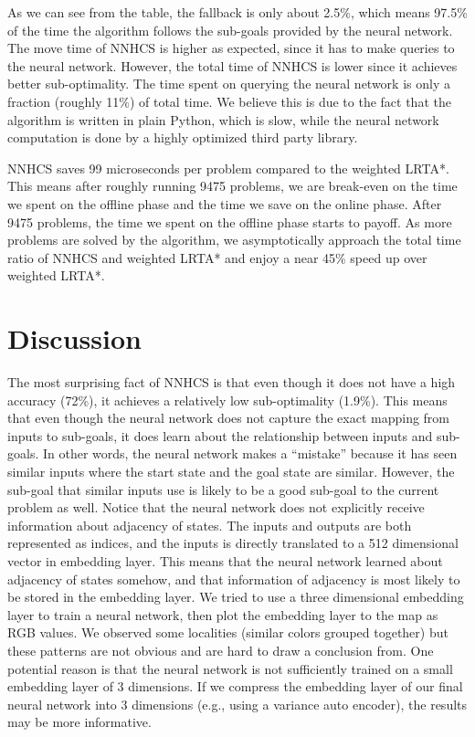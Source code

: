 \documentclass[letterpaper]{article}
\numberwithin{equation}{section}
\numberwithin{theorem}{section}
\numberwithin{lemma}{section}
\numberwithin{df}{section}
\begin{document}
    As we can see from the table, the fallback is only about 2.5\%, which means 97.5\% of the time the algorithm follows the sub-goals provided by the neural network.
    The move time of NNHCS is higher as expected, since it has to make queries to the neural network.
    However, the total time of NNHCS is lower since it achieves better sub-optimality.
    The time spent on querying the neural network is only a fraction (roughly 11\%) of total time.
    We believe this is due to the fact that the algorithm is written in plain Python, which is slow,
    while the neural network computation is done by a highly optimized third party library.

    NNHCS saves 99 microseconds per problem compared to the weighted LRTA*.
    This means after roughly running 9475 problems, we are break-even on the time we spent on the offline phase and the time we save on the online phase.
    After 9475 problems, the time we spent on the offline phase starts to payoff.
    As more problems are solved by the algorithm, we asymptotically approach the total time ratio of NNHCS and weighted LRTA* and enjoy a near 45\% speed up over weighted LRTA*.

    \section{Discussion}\label{sec:discussion}


    The most surprising fact of NNHCS is that even though it does not have a high accuracy (72\%), it achieves a relatively low sub-optimality (1.9\%).
    This means that even though the neural network does not capture the exact mapping from inputs to sub-goals,
    it does learn about the relationship between inputs and sub-goals.
    In other words, the neural network makes a ``mistake'' because it has seen similar inputs where the start state and the goal state are similar.
    However, the sub-goal that similar inputs use is likely to be a good sub-goal to the current problem as well.
    Notice that the neural network does not explicitly receive information about adjacency of states.
    The inputs and outputs are both represented as indices, and the inputs is directly translated to a 512 dimensional vector in embedding layer.
    This means that the neural network learned about adjacency of states somehow, and that information of adjacency is most likely to be stored in the embedding layer.
    We tried to use a three dimensional embedding layer to train a neural network, then plot the embedding layer to the map as RGB values.
    We observed some localities (similar colors grouped together) but these patterns are not obvious and are hard to draw a conclusion from.
    One potential reason is that the neural network is not sufficiently trained on a small embedding layer of 3 dimensions.
    If we compress the embedding layer of our final neural network into 3 dimensions (e.g., using a variance auto encoder), the results may be more informative.
\end{document}
